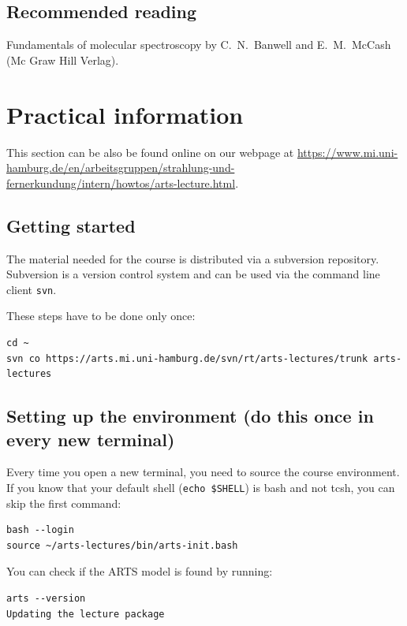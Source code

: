 \subsection*{Recommended reading}

Fundamentals of molecular spectroscopy by C.\ N.\
Banwell and E.\ M.\ McCash (Mc Graw Hill Verlag).


\section{Practical information}

This section can be also be found online on our webpage at
\url{https://www.mi.uni-hamburg.de/en/arbeitsgruppen/strahlung-und-fernerkundung/intern/howtos/arts-lecture.html}.

\subsection*{Getting started}

The material needed for the course is distributed via a subversion repository.
Subversion is a version control system and can be used via the command line
client \verb|svn|.

These steps have to be done only once:

\begin{verbatim}
cd ~
svn co https://arts.mi.uni-hamburg.de/svn/rt/arts-lectures/trunk arts-lectures
\end{verbatim}

\subsection*{Setting up the environment
(do this once in every new terminal)}
\label{sec:setup-env}


Every time you open a new terminal, you need to source the course environment.
If you know that your default shell (\verb|echo $SHELL|) is bash and not tcsh,
you can skip the first command:

\begin{verbatim}
bash --login
source ~/arts-lectures/bin/arts-init.bash
\end{verbatim}

You can check if the ARTS model is found by running:

\begin{verbatim}
arts --version
Updating the lecture package
\end{verbatim}

